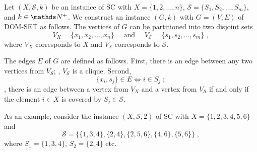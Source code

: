 \documentclass{exercise}
\begin{document}
  \begin{solution}
    Let $(X,\mathcal{S},k)$ be an instance of SC with $X=\{1,2,\dots,n\}$,
    $\mathcal{S}=\{S_1,S_2,\dots,S_m\}$, and $k\in\nat^+$.  We construct an
    instance $(G,k)$ with $G=(V,E)$ of DOM-SET as follows.  The vertices of $G$ can
    be partitioned into two disjoint sets
    \[ V_X = \{x_1,x_2,\dots,x_n\} \quad \text{ and } \quad V_{\mathcal{S}}=\{s_1,s_2,\dots,s_m\} \;, \]
    where $V_X$ corresponds to $X$ and $V_{\mathcal{S}}$ corresponds to
    $\mathcal{S}$.
    
    The edges $E$ of $G$ are defined as follows.  First, there is an
    edge between any two vertices from $V_{\mathcal{S}}$; \ie, $V_{\mathcal{S}}$
    is a clique.  Second, 
    \[ \{x_i,s_j\}\in E \iff i\in S_j\;; \]
    \ie, there is an edge between a vertex from $V_X$ and a vertex from $V_{\mathcal{S}}$
		if and only if the element $i\in X$ is covered by $S_j\in\mathcal{S}$.

    As an example, consider the instance $(X,\mathcal{S},2)$ of SC with
    $X=\{1,2,3,4,5,6\}$ and
    \[ \mathcal{S} = \big\{\{1,3,4\}, \{2,4\}, \{2,5,6\}, \{4,6\}, \{5,6\} \big\}\;, \]
    where $S_1=\{1,3,4\}$, $S_2=\{2,4\}$ etc.


\end{solution}
\end{document}
